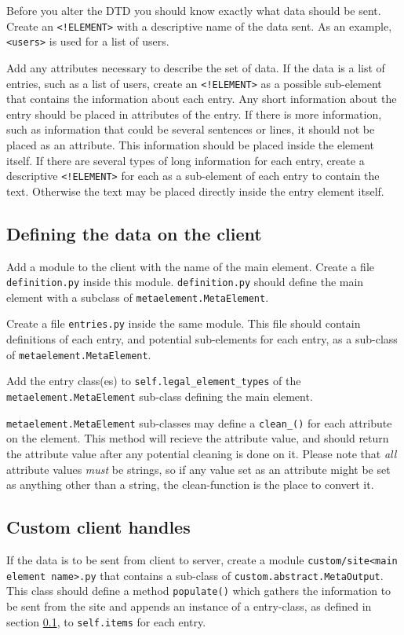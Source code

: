 \documentclass[titlepage, a4paper,10pt]{article}
\begin{document}
Before you alter the DTD you should know exactly what data should be sent.
Create an \texttt{<!ELEMENT>} with a descriptive name of the data sent. As an
example, \texttt{<users>} is used for a list of users. 

Add any attributes necessary to describe the set of data. If the data is a list
of entries, such as a list of users, create an \texttt{<!ELEMENT>} as a
possible sub-element that contains the information about each entry. Any short
information about the entry should be placed in attributes of the entry. If
there is more information, such as information that could be several sentences
or lines, it should not be placed as an attribute. This information should be
placed inside the element itself. If there are several types of long
information for each entry, create a descriptive \texttt{<!ELEMENT>} for each
as a sub-element of each entry to contain the text. Otherwise the text may be
placed directly inside the entry element itself. 

\subsection{Defining the data on the client}
\label{sec:defclientmodel}
Add a module to the client with the name of the main element. Create a file
\texttt{definition.py} inside this module. \texttt{definition.py} should define
the main element with a subclass of \texttt{metaelement.MetaElement}.

Create a file \texttt{entries.py} inside the same module. This file should
contain definitions of each entry, and potential sub-elements for each entry,
as a sub-class of \texttt{metaelement.MetaElement}. 

Add the entry class(es) to \texttt{self.legal\_element\_types} of the \\ 
\texttt{metaelement.MetaElement} sub-class defining the main element. 

\texttt{metaelement.MetaElement} sub-classes may define a
\texttt{clean\_<attribute name>()} for each attribute on the element. This method
will recieve the attribute value, and should return the attribute value after
any potential cleaning is done on it. Please note that \textit{all} attribute
values \textit{must} be strings, so if any value set as an attribute might be
set as anything other than a string, the clean-function is the place to convert
it.

\subsection{Custom client handles}
If the data is to be sent from client to server, create a module
\texttt{custom/site<main element name>.py} that contains a sub-class of
\texttt{custom.abstract.MetaOutput}. This class should define a method
\texttt{populate()} which gathers the information to be sent from the site and
appends an instance of a entry-class, as defined in section
\ref{sec:defclientmodel}, to \texttt{self.items} for each entry.
\end{document}

